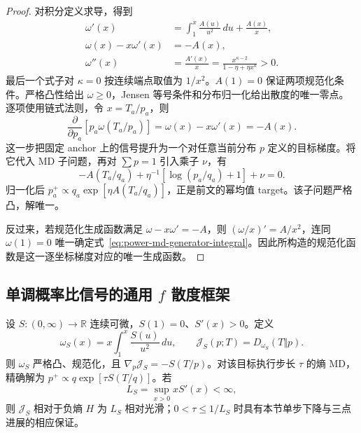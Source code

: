 \begin{proof}
对积分定义求导，得到
\begin{align}
 \omega'(x)&=\int_1^x\frac{A(u)}{u^2}\,du+\frac{A(x)}x,\\
 \omega(x)-x\omega'(x)&=-A(x),\\
 \omega''(x)&=\frac{A'(x)}x
 =\frac{x^{\kappa-2}}{1-\eta+\eta x^\kappa}>0.
 \label{eq:power-md-curvature}
\end{align}
最后一个式子对 $\kappa=0$ 按连续端点取值为 $1/x^2$。$A(1)=0$ 保证两项规范化条件。严格凸性给出 $\omega\ge0$，Jensen 等号条件和分布归一化给出散度的唯一零点。逐项使用链式法则，令 $x=T_a/p_a$，则
\begin{equation}
 \frac\partial{\partial p_a}[p_a\omega(T_a/p_a)]
 =\omega(x)-x\omega'(x)=-A(x).
\end{equation}
这一步把固定 anchor 上的信号提升为一个对任意当前分布 $p$ 定义的目标梯度。将它代入 MD 子问题，再对 $\sum p=1$ 引入乘子 $\nu$，有
\begin{equation}
 -A(T_a/q_a)+\eta^{-1}[\log(p_a/q_a)+1]+\nu=0.
\end{equation}
归一化后 $p_a^+\propto q_a\exp[\eta A(T_a/q_a)]$，正是前文的幂均值 target。该子问题严格凸，解唯一。

反过来，若规范化生成函数满足 $\omega-x\omega'=-A$，则 $(\omega/x)'=A/x^2$，连同 $\omega(1)=0$ 唯一确定式~\eqref{eq:power-md-generator-integral}。因此所构造的规范化函数是这一逐坐标梯度对应的唯一生成函数。
\end{proof}

\subsection{单调概率比信号的通用 $f$ 散度框架}

\begin{proposition}[单调信号的可积性与相对光滑性]
\label{prop:power-general-signal-framework}
设 $S:(0,\infty)\to\mathbb R$ 连续可微，$S(1)=0$、$S'(x)>0$。定义
\begin{equation}
 \omega_S(x)=x\int_1^x\frac{S(u)}{u^2}\,du,\qquad
 \mathcal J_S(p;T)=D_{\omega_S}(T\Vert p).
\end{equation}
则 $\omega_S$ 严格凸、规范化，且 $\nabla_p\mathcal J_S=-S(T/p)$。对该目标执行步长 $\tau$ 的熵 MD，精确解为 $p^+\propto q\exp[\tau S(T/q)]$。若
\begin{equation}
 L_S=\sup_{x>0}xS'(x)<\infty,
\end{equation}
则 $\mathcal J_S$ 相对于负熵 $H$ 为 $L_S$ 相对光滑；$0<\tau\le1/L_S$ 时具有本节单步下降与三点进展的相应保证。
\end{proposition}

